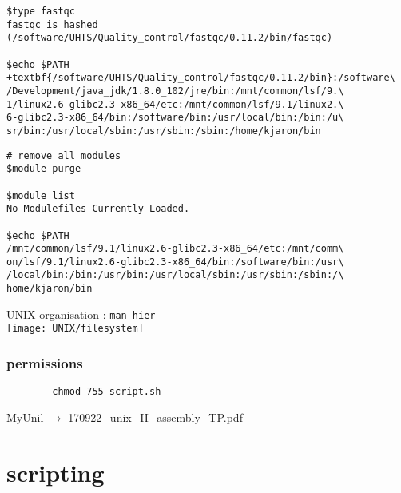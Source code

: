 \documentclass[xcolor=dvipsnames]{beamer}
\begin{document}
\begin{frame}[fragile]
\footnotesize
\begin{Verbatim}[commandchars=\+\{\}]
$type fastqc
fastqc is hashed
(/software/UHTS/Quality_control/fastqc/0.11.2/bin/fastqc)

$echo $PATH
+textbf{/software/UHTS/Quality_control/fastqc/0.11.2/bin}:/software\
/Development/java_jdk/1.8.0_102/jre/bin:/mnt/common/lsf/9.\
1/linux2.6-glibc2.3-x86_64/etc:/mnt/common/lsf/9.1/linux2.\
6-glibc2.3-x86_64/bin:/software/bin:/usr/local/bin:/bin:/u\
sr/bin:/usr/local/sbin:/usr/sbin:/sbin:/home/kjaron/bin
\end{Verbatim}
\end{frame}

\begin{frame}[fragile]
\footnotesize
\begin{verbatim}
# remove all modules
$module purge

$module list
No Modulefiles Currently Loaded.

$echo $PATH
/mnt/common/lsf/9.1/linux2.6-glibc2.3-x86_64/etc:/mnt/comm\
on/lsf/9.1/linux2.6-glibc2.3-x86_64/bin:/software/bin:/usr\
/local/bin:/bin:/usr/bin:/usr/local/sbin:/usr/sbin:/sbin:/\
home/kjaron/bin
\end{verbatim}
\end{frame}

\begin{frame}[fragile]
	\begin{center}
		\huge
		UNIX organisation : \verb!man hier! \\
		\vspace{1cm}
		\texttt{[image: UNIX/filesystem]}
	\end{center}
\end{frame}

\begin{frame}[fragile]
	\frametitle{permissions}
	\large
	\begin{verbatim}
		chmod 755 script.sh
	\end{verbatim}
\end{frame}

\begin{frame}
	\begin{center}
		\Large
		MyUnil $\rightarrow$ 170922\_unix\_II\_assembly\_TP.pdf
	\end{center}
\end{frame}

\section{scripting}
\end{document}
